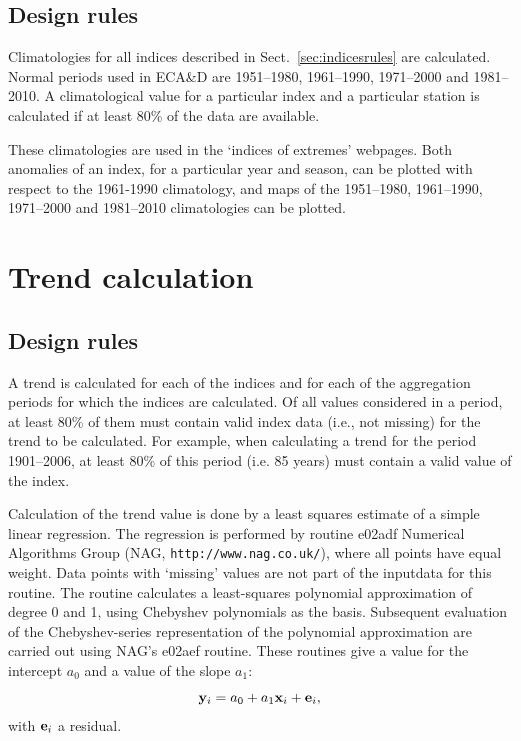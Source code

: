 \documentclass[a4paper,11pt]{article}
\begin{document}
\subsection{Design rules}
\label{sec:climatologyrules}
Climatologies for all indices described in Sect.~\ref{sec:indicesrules}
are calculated. Normal periods used in ECA\&D are 1951--1980, 1961--1990, 1971--2000
and 1981--2010.
A climatological value for a particular index and a particular station is
calculated if at least 80\% of the data are available.

These climatologies are used in the `indices of extremes' webpages. Both anomalies
of an index, for a particular year and season, can be plotted with respect to the
1961-1990 climatology, and maps of the 1951--1980, 1961--1990, 1971--2000 and 1981--2010 climatologies can
be plotted.


\section{Trend calculation}
\label{sec:trend}
\subsection{Design rules}
\label{sec:trendrules}

A trend is calculated for each of the indices and for each of the
aggregation periods for which the indices are calculated. Of all values considered
in a period, at least 80\% of them must contain valid index data
(i.e., not missing) for the trend to be calculated.
For example, when calculating a trend for the
period 1901--2006, at least 80\% of this period (i.e. 85 years) must
contain a valid value of the index. 

Calculation of the trend value is done by a least squares estimate of a simple linear regression. The regression is
performed by routine e02adf Numerical Algorithms Group (NAG, {\tt http://www.nag.co.uk/}), 
where all points have equal weight. Data points with `missing' values are not
part of the inputdata for this routine. The routine calculates a least-squares polynomial approximation of degree 0
and 1, using Chebyshev polynomials as the basis.  Subsequent evaluation of the Chebyshev-series representation
of the polynomial approximation are carried out using NAG's e02aef routine.
These routines give a value for the intercept $a_0$ and a value of the slope $a_1$:
\begin{equation*}
{\bf y}_i = a_0 + a_1 {\bf x}_i + {\bf e}_i,
\end{equation*}
with ${\bf e}_i$ a residual.
\end{document}
